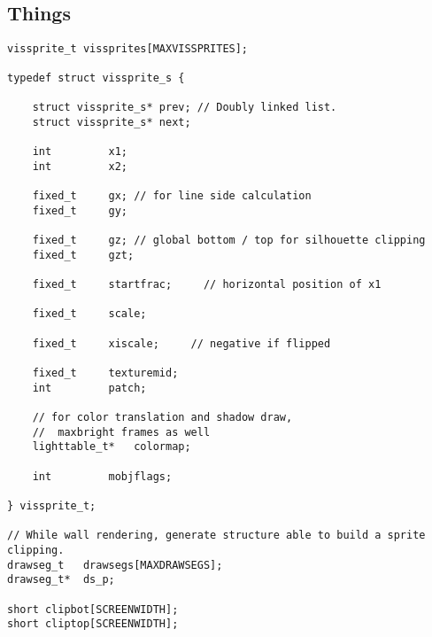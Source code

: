 \pagebreak

\\
\\
\\
\\

\par

\subsection{Things}
\begin{verbatim}
vissprite_t	vissprites[MAXVISSPRITES];

typedef struct vissprite_s {
    
    struct vissprite_s*	prev; // Doubly linked list.
    struct vissprite_s*	next;
    
    int			x1;
    int			x2;
    
    fixed_t		gx; // for line side calculation
    fixed_t		gy;		

    fixed_t		gz; // global bottom / top for silhouette clipping
    fixed_t		gzt;

    fixed_t		startfrac;     // horizontal position of x1
    
    fixed_t		scale;
        
    fixed_t		xiscale;	 // negative if flipped

    fixed_t		texturemid;
    int			patch;

    // for color translation and shadow draw,
    //  maxbright frames as well
    lighttable_t*	colormap;
   
    int			mobjflags;
    
} vissprite_t;

// While wall rendering, generate structure able to build a sprite clipping.
drawseg_t	drawsegs[MAXDRAWSEGS];
drawseg_t*	ds_p;

short clipbot[SCREENWIDTH];
short cliptop[SCREENWIDTH];

\end{verbatim}

